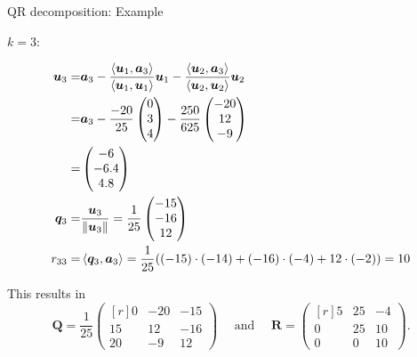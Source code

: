 \documentclass[11pt,compress,t,notes=noshow, xcolor=table]{beamer}
\begin{document}
\begin{vbframe}{QR decomposition: Example}
\begin{footnotesize}
\framebreak

$k = 3$:

\begin{align*}
  \bm{u}_3 =& \bm{a}_3 - \frac{\langle \bm{u}_1, \bm{a}_3 \rangle}{\langle \bm{u}_1, \bm{u}_1 \rangle} \bm{u}_1
                       - \frac{\langle \bm{u}_2, \bm{a}_3 \rangle}{\langle \bm{u}_2, \bm{u}_2 \rangle} \bm{u}_2 \\
           =& \bm{a}_3 - \frac{-20}{25} \begin{pmatrix} 0 \\ 3 \\ 4 \end{pmatrix} - \frac{250}{625} \begin{pmatrix} -20 \\ 12 \\ -9 \end{pmatrix} \\
           =& \begin{pmatrix} -6 \\ -6.4 \\ 4.8 \end{pmatrix} \\
  \bm{q}_3 =& \frac{\bm{u}_3}{\|\bm{u}_3\|} = \frac{1}{25} \begin{pmatrix} -15 \\ -16 \\ 12 \end{pmatrix} \\
  r_{33} =& \left\langle \bm{q}_3, \bm{a}_3 \right\rangle = \frac{1}{25} ((-15) \cdot (-14) + (-16) \cdot (-4) + 12 \cdot (-2)) = 10
\end{align*}
\end{footnotesize}

\framebreak



\framebreak

This results in
$$
\mathbf{Q} = \frac{1}{25} \begin{pmatrix*}[r]
0 & -20 & -15 \\
15 & 12 & -16 \\
20 & -9 & 12 \end{pmatrix*}
\quad \text{ and } \quad \mathbf{R} = \begin{pmatrix*}[r]
5 & 25 & -4 \\
0 & 25 & 10 \\
0 & 0 & 10 \end{pmatrix*}.
$$

\end{vbframe}
\end{document}
